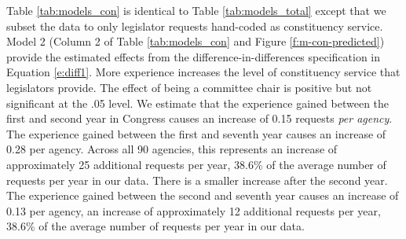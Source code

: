 \documentclass[12pt]{article}
\begin{document}
Table \ref{tab:models_con} is identical to Table \ref{tab:models_total} except that we subset the data to only legislator requests hand-coded as constituency service. 
Model 2 (Column 2 of Table \ref{tab:models_con} and Figure \ref{f:m-con-predicted}) provide the estimated effects from the difference-in-differences specification in Equation \ref{e:diff1}. More experience increases the level of constituency service that legislators provide. The effect of being a committee chair is positive but not significant at the .05 level. We estimate that the experience gained between the first and second year in Congress causes an increase of 0.15 requests \textit{per agency}. The experience gained between the first and seventh year causes an increase of 0.28 per agency. Across all 90 agencies, this represents an increase of approximately 25 additional requests per year, 38.6\% of the average number of requests per year in our data. There is a smaller increase after the second year. The experience gained between the second and seventh year causes an increase of 0.13 per agency, an increase of approximately 12 additional requests per year, 38.6\% of the average number of requests per year in our data.
\end{document}
